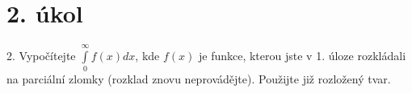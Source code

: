 \section{2. úkol}
  2. Vypočítejte  $\int\limits_0^\infty f(x) dx$, kde $f(x)$ je funkce, kterou jste v 1. úloze rozkládali na parciální zlomky (rozklad znovu neprovádějte). Použijte již rozložený tvar.
